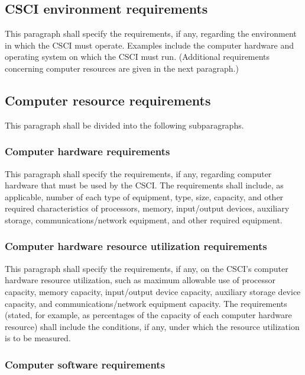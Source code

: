 \subsection{CSCI environment requirements}

This paragraph shall specify the requirements, if any, regarding the
environment in which the CSCI must operate. Examples include the
computer hardware and operating system on which the CSCI must run.
(Additional requirements concerning computer resources are given in the
next paragraph.)

\subsection{Computer resource requirements}

This paragraph shall be divided into the following subparagraphs.

\subsubsection{Computer hardware requirements}

This paragraph shall specify the requirements, if any, regarding
computer hardware that must be used by the CSCI. The requirements shall
include, as applicable, number of each type of equipment, type, size,
capacity, and other required characteristics of processors, memory,
input/output devices, auxiliary storage, communications/network
equipment, and other required equipment.

\subsubsection{Computer hardware resource utilization
requirements}

This paragraph shall specify the requirements, if any, on the CSCI's
computer hardware resource utilization, such as maximum allowable use of
processor capacity, memory capacity, input/output device capacity,
auxiliary storage device capacity, and communications/network equipment
capacity. The requirements (stated, for example, as percentages of the
capacity of each computer hardware resource) shall include the
conditions, if any, under which the resource utilization is to be
measured.

\subsubsection{Computer software requirements}

